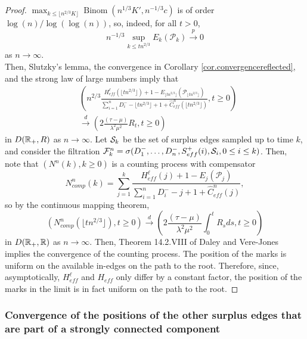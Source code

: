 \begin{proof}
 $\max_{k\leq \lfloor n^{2/3} K \rfloor} \operatorname{Binom}(n^{1/3}K',n^{-1/3}c)$ is of order $\log(n)/\log(\log(n))$, so, indeed, for all $t>0$, $$n^{-1/3}\sup_{k\leq tn^{2/3}}E_k(\mathcal{P}_k)\overset{p}{\to}0$$ as $n\to \infty$. \\
Then, Slutzky's lemma, the convergence in Corollary \ref{cor.convergencereflected}, and the strong law of large numbers imply that 
\begin{align*}&\left(n^{2/3}\frac{H^\ell_{eff}\left(\lfloor t n^{2/3}\rfloor \right)+1-E_{\lfloor t n^{2/3}\rfloor}(\mathcal{P}_{\lfloor t n^{2/3}\rfloor})}{\sum_{i=1}^n D^-_i-\lfloor t n^{2/3}\rfloor+1+\hat{C}^n_{eff}(\lfloor t n^{2/3}\rfloor)}, t\geq 0\right)\\
&\overset{d}{\to} \left(2\frac{(\tau-\mu)}{\lambda^2\mu^2}R_t,t\geq 0\right)\end{align*}
in $D({\mathbb R}_+,R)$ as $n\to\infty$.
Let ${\mathcal S}_k$ be the set of surplus edges sampled up to time $k$, and consider the filtration ${\mathcal F}_k^n=\sigma(D^-_1,\dots,D^-_n,S^+_{eff}(i), {\mathcal S}_i, 0\leq i \leq k)$. Then, note that $(N^n(k),k\geq 0)$ is a counting process with compensator 
$$N^n_{comp}(k)=\sum_{j=1}^k\frac{H^\ell_{eff}(j)+1-E_j(\mathcal{P}_j)}{\sum_{i=1}^n D^-_i-j+1+\hat{C}^n_{eff}(j)},$$
so by the continuous mapping theorem,
$$\left(N^n_{comp}\left(\lfloor t n^{2/3}\rfloor\right),t\geq 0\right)\overset{d}{\to}\left(2\frac{(\tau-\mu)}{\lambda^2\mu^2}\int_0^tR_sds,t\geq 0\right)$$
in $D({\mathbb R}_+,{\mathbb R})$ as $n\to\infty$. Then, Theorem 14.2.VIII of Daley and Vere-Jones \cite{DaleyVereJones} implies the convergence of the counting process. The position of the marks is uniform on the available in-edges on the path to the root. Therefore, since, asymptotically, $H^\ell_{eff}$ and $H_{eff}$ only differ by a constant factor, the position of the marks in the limit is in fact uniform on the path to the root. 
\end{proof}
\subsubsection{Convergence of the positions of the other surplus edges that are part of a strongly connected component}


